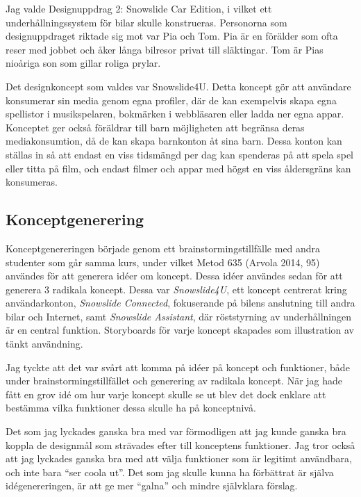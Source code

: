 Jag valde Designuppdrag 2: Snowslide Car Edition, i vilket ett
underhållningssystem för bilar skulle konstrueras. Personorna som
designuppdraget riktade sig mot var Pia och Tom. Pia är en förälder 
som ofta reser med jobbet och åker långa bilresor privat till släktingar. Tom
är Pias nioåriga son som gillar roliga prylar.

Det designkoncept som valdes var Snowslide4U. Detta koncept gör att användare
konsumerar sin media genom egna profiler, där de kan exempelvis skapa egna
spellistor i musikspelaren, bokmärken i webbläsaren eller ladda ner egna appar.
Konceptet ger också föräldrar till barn möjligheten att begränsa deras
mediakonsumtion, då de kan skapa barnkonton åt sina barn. Dessa konton kan
ställas in så att endast en viss tidsmängd per dag kan spenderas på att spela
spel eller titta på film, och endast filmer och appar med högst en viss
åldersgräns kan konsumeras.

\subsection*{Konceptgenerering}

Konceptgenereringen började genom ett brainstormingstillfälle med andra
studenter som går samma kurs, under vilket Metod 635 (Arvola 2014, 95) användes
för att generera idéer om koncept. Dessa idéer användes sedan för att generera
3 radikala koncept. Dessa var \textit{Snowslide4U}, ett koncept centrerat kring
användarkonton, \textit{Snowslide Connected}, fokuserande på bilens anslutning
till andra bilar och Internet, samt \textit{Snowslide Assistant}, där
röststyrning av underhållningen är en central funktion. Storyboards för varje
koncept skapades som illustration av tänkt användning.

Jag tyckte att det var svårt att komma på idéer på koncept och funktioner, både
under brainstormingstillfället och generering av radikala koncept. När jag hade
fått en grov idé om hur varje koncept skulle se ut blev det dock enklare att
bestämma vilka funktioner dessa skulle ha på konceptnivå.

Det som jag lyckades ganska bra med var förmodligen att jag kunde ganska bra
koppla de designmål som strävades efter till konceptens funktioner. Jag tror
också att jag lyckades ganska bra med att välja funktioner som är legitimt
användbara, och inte bara ``ser coola ut''. Det som jag skulle kunna ha
förbättrat är själva idégenereringen, är att ge mer ``galna'' och mindre
självklara förslag.



